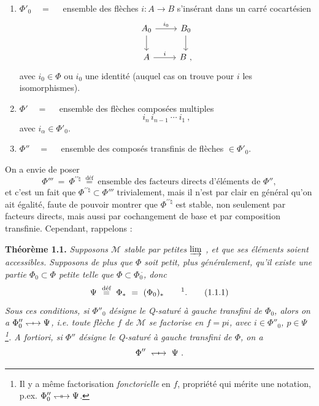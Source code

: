\documentclass[11pt]{article}
\newcommand{\msp}[1]{\marginpar{\footnotesize [#1]}}
\newcommand{\Qod}{\mathrel{\leftharpoondown\joinrel\relbar\joinrel\rightarrow}}       %
\newcommand{\Qx}[2]{\mathrel{#1\joinrel\mapstochar#2}}
\newcommand{\Qxx}[2]{\mathrel{#1\joinrel\mapstochar\mkern2mu\mapstochar#2}}
\newcommand{\tld}{\tilde{}}   %
\begin{document}
\begin{enumerate}[leftmargin=*]
\item[1)] $\Phi'_0 \quad = \quad$ ensemble des flèches $i : A \longrightarrow B$ s'insérant dans un carré cocartésien
\[
\begin{tikzcd}
A_0 \arrow[r, "i_0"] \arrow[d] & B_0 \arrow[d]\\
A \arrow[r, "i"] & B\ ,
\end{tikzcd}
\]
avec $i_0 \in \Phi$ ou $i_0$ une identité (auquel cas on trouve pour $i$ les isomorphismes).

\item[2)] $\Phi' \quad = \quad$ ensemble des flèches composées multiples
\[
i_n \, i_{n-1} \ \cdots \ i_1\ ,
\]
avec $i_\alpha \in \Phi'_0$.

\item[3)] $\Phi'' \quad = \quad$ ensemble des composés transfinis de flèches $\in \Phi'_0$.
\end{enumerate}

On a envie de poser
\[
\Phi''' \ = \ \Phi^{\prime\prime\natural} \ \overset{\text{déf}}{=} \ \text{ensemble des facteurs directs d'éléments de } \Phi'',
\]
et c'est un fait que $\Phi^{\prime\prime\natural} \subset \Phi'''$ trivialement, mais il n'est par clair en général qu'on ait %
\msp{page 5}
égalité, faute de pouvoir montrer que $\Phi^{\prime\prime\natural}$ est stable, non seulement par facteurs directs, mais aussi par cochangement de base et par composition transfinie. Cependant, rappelons :

\textbf{Théorème 1.1.} \textit{Supposons $\mathcal{M}$ stable par petites $\varinjlim$ , et que ses éléments soient accessibles. Supposons de plus que $\Phi$ soit petit, plus généralement, qu'il existe une partie $\Phi_0 \subset \Phi$ petite telle que $\Phi \subset \Phi_0{}^{\tld}$, donc}
\[
\Psi \ \overset{\text{déf}}{=} \ \Phi_{*} \ = \ (\Phi_0)_{*} \qquad \text{\footnotemark}.
\tag*{(1.1.1)} %
\]
\footnotetext{\textbf{N.B.} On a donc $\Phi \Qod \Psi$, a fortiori $\Phi_0 \Qod \Psi$.}
\textit{Sous ces conditions, si $\Phi''_0$ désigne le \textup{Q}-saturé à gauche transfini de $\Phi_0$, alors on a $\Phi''_0 \Qx{\leftharpoondown}{\rightarrow} \Psi$, i.e. toute flèche $f$ de $\mathcal{M}$ se factorise en $f = pi$, avec $i \in \Phi''_0$, $p \in \Psi$\,\footnote{Il y a même factorisation \textit{fonctorielle} en $f$, propriété qui mérite une notation, p.ex. $\Phi''_0 \Qxx{\leftharpoondown}{\rightarrow} \Psi$.}. A fortiori, si $\Phi''$ désigne le \textup{Q}-saturé à gauche transfini de $\Phi$, on a} %
\[
\Phi'' \ \Qx{\leftharpoondown}{\rightarrow} \ \Psi\ .
\]
\end{document}
